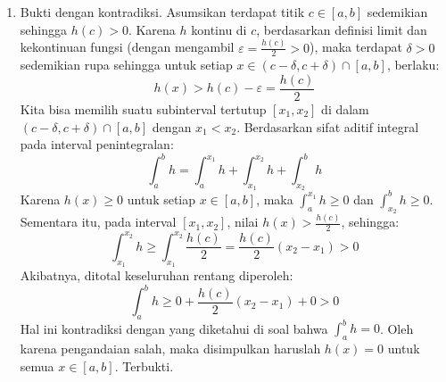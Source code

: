 \documentclass[11pt,letterpaper]{article}
\begin{document}
\begin{enumerate}
  \item Bukti dengan kontradiksi. Asumsikan terdapat titik $c \in [a,b]$ sedemikian sehingga $h(c) > 0$.
        Karena $h$ kontinu di $c$, berdasarkan definisi limit dan kekontinuan fungsi (dengan mengambil $\varepsilon = \frac{h(c)}{2} > 0$), maka terdapat $\delta > 0$ sedemikian rupa sehingga untuk setiap $x \in (c-\delta, c+\delta) \cap [a,b]$, berlaku:
        \[ h(x) > h(c) - \varepsilon = \frac{h(c)}{2} \]
        Kita bisa memilih suatu subinterval tertutup $[x_1, x_2]$ di dalam $(c-\delta, c+\delta) \cap [a,b]$ dengan $x_1 < x_2$. Berdasarkan sifat aditif integral pada interval penintegralan:
        \[ \int_a^b h = \int_a^{x_1} h + \int_{x_1}^{x_2} h + \int_{x_2}^b h \]
        Karena $h(x) \geq 0$ untuk setiap $x \in [a,b]$, maka $\int_a^{x_1} h \geq 0$ dan $\int_{x_2}^b h \geq 0$. Sementara itu, pada interval $[x_1, x_2]$, nilai $h(x) > \frac{h(c)}{2}$, sehingga:
        \[ \int_{x_1}^{x_2} h \geq \int_{x_1}^{x_2} \frac{h(c)}{2} = \frac{h(c)}{2} (x_2 - x_1) > 0 \]
        Akibatnya, ditotal keseluruhan rentang diperoleh:
        \[ \int_a^b h \geq 0 + \frac{h(c)}{2} (x_2 - x_1) + 0 > 0 \]
        Hal ini kontradiksi dengan yang diketahui di soal bahwa $\int_a^b h = 0$.
        Oleh karena pengandaian salah, maka disimpulkan haruslah $h(x) = 0$ untuk semua $x \in [a,b]$. Terbukti.
\end{enumerate}
\end{document}
